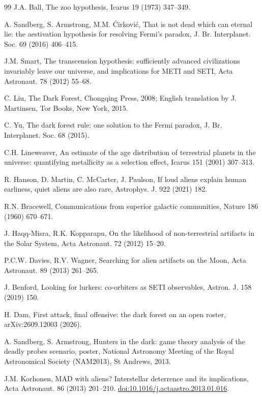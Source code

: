 \documentclass[preprint,12pt]{elsarticle}
\theoremstyle{definition}
\begin{document}
\begin{thebibliography}{99}
 J.A. Ball, The zoo hypothesis, Icarus 19 (1973) 347--349.

 A. Sandberg, S. Armstrong, M.M. \'Cirkovi\'c, That is not dead which can eternal lie: the aestivation hypothesis for resolving Fermi's paradox, J. Br. Interplanet. Soc. 69 (2016) 406--415.

 J.M. Smart, The transcension hypothesis: sufficiently advanced civilizations invariably leave our universe, and implications for METI and SETI, Acta Astronaut. 78 (2012) 55--68.

 C. Liu, The Dark Forest, Chongqing Press, 2008; English translation by J. Martinsen, Tor Books, New York, 2015.

 C. Yu, The dark forest rule: one solution to the Fermi paradox, J. Br. Interplanet. Soc. 68 (2015).

 C.H. Lineweaver, An estimate of the age distribution of terrestrial planets in the universe: quantifying metallicity as a selection effect, Icarus 151 (2001) 307--313.

 R. Hanson, D. Martin, C. McCarter, J. Paulson, If loud aliens explain human earliness, quiet aliens are also rare, Astrophys. J. 922 (2021) 182.

 R.N. Bracewell, Communications from superior galactic communities, Nature 186 (1960) 670--671.

 J. Haqq-Misra, R.K. Kopparapu, On the likelihood of non-terrestrial artifacts in the Solar System, Acta Astronaut. 72 (2012) 15--20.

 P.C.W. Davies, R.V. Wagner, Searching for alien artifacts on the Moon, Acta Astronaut. 89 (2013) 261--265.

 J. Benford, Looking for lurkers: co-orbiters as SETI observables, Astron. J. 158 (2019) 150.

 H. Dam, First attack, final offensive: the dark forest on an open roster, arXiv:2609.12003 (2026).

 A. Sandberg, S. Armstrong, Hunters in the dark: game theory analysis of the deadly probes scenario, poster, National Astronomy Meeting of the Royal Astronomical Society (NAM2013), St Andrews, 2013.

 J.M. Korhonen, MAD with aliens? Interstellar deterrence and its implications, Acta Astronaut. 86 (2013) 201--210. \href{https://doi.org/10.1016/j.actaastro.2013.01.016}{doi:10.1016/j.actaastro.2013.01.016}.


\end{thebibliography}
\end{document}
